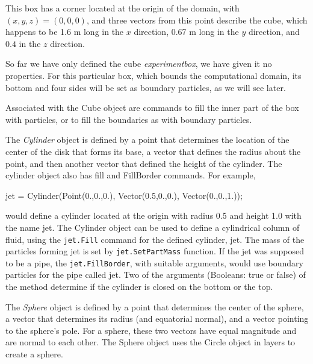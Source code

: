 \documentclass{../GPUSPHtemplate}
\begin{document}
This box has a corner located at the origin of the domain, with $(x, y,
z) = (0,0,0)$, and three vectors from this point describe the cube,
which happens to be 1.6 m long in the $x$ direction, 0.67 m long in the
$y$ direction, and $0.4$ in the $z$ direction.

So far we have only defined the cube {\em experiment\-box}, we have
given it no properties. For this particular box, which bounds the
computational domain, its bottom and four sides will be set as boundary
particles, as we will see later.

Associated with the Cube object are commands to fill the inner part of
the box with particles, or to fill the boundaries as with boundary
particles. %


The {\em Cylinder} object is defined by a point that determines the
location of the center of the disk that forms its base, a vector that
defines the radius about the point, and then another vector that defined
the height of the cylinder. The cylinder object also has fill and
FillBorder commands. For example,

jet = Cylinder(Point(0.,0.,0.), Vector(0.5,0.,0.), Vector(0.,0.,1.));

would define a cylinder located at the origin with radius 0.5 and
height 1.0 with the name jet. The Cylinder object can be used to
define a cylindrical column of fluid, using the \verb!jet.Fill!
command for the defined cylinder, jet. The mass of the particles
forming jet is set by \verb!jet.SetPartMass! function. If the jet was
supposed to be a pipe, the \verb!jet.FillBorder!, with suitable
arguments, would use boundary particles for the pipe called jet. Two
of the arguments (Booleans: true or false) of the method determine if
the cylinder is closed on the bottom or the top.


The {\em Sphere} object is defined by a point that determines the center
of the sphere, a vector that determines its radius (and equatorial
normal), and a vector pointing to the sphere's pole. For a sphere,
these two vectors have equal magnitude and are normal to each other.
The Sphere object uses the Circle object in layers to create a sphere.
\end{document}
